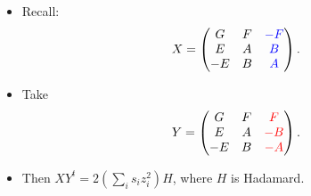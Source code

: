 \documentclass{beamer}
\newcommand{\rred}[1]{\textcolor{red}{#1}}
\newcommand{\bblue}[1]{\textcolor{blue}{#1}}
\begin{document}
\begin{frame}

  \begin{itemize}
    \item Recall:
      \[
        X = \begin{pmatrix}
              G & F & \bblue{-F} \\
              E & A & \bblue{B} \\
              -E & B & \bblue{A}
            \end{pmatrix}.
      \]
    \item Take
      \[
        Y = \begin{pmatrix}
              G & F & \rred{F} \\
              E & A & \rred{-B} \\
              -E & B & \rred{-A}
            \end{pmatrix}.
      \]
    \item Then $XY^t = 2\left( \sum_is_iz_i^2 \right)H$, where $H$ is Hadamard.
  \end{itemize}
  
\end{frame}
\end{document}
